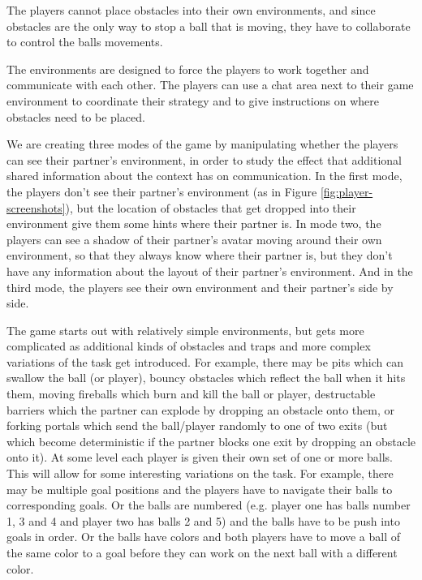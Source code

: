 The players cannot place obstacles into their own environments, and
since obstacles are the only way to stop a ball that is moving, they
have to collaborate to control the balls movements. 



The environments are designed to force the players to work together
and communicate with each other.  The players can use a chat area next
to their game environment to coordinate their strategy and to give
instructions on where obstacles need to be placed.



We are creating three modes of the game by manipulating whether the
players can see their partner's environment, in order to study the
effect that additional shared information about the context has on
communication.  In the first mode, the players don't see their
partner's environment (as in Figure \ref{fig:player-screenshots}), but
the location of obstacles that get dropped into their environment give
them some hints where their partner is. In mode two, the players can
see a shadow of their partner's avatar moving around their own
environment, so that they always know where their partner is, but they
don't have any information about the layout of their partner's
environment. And in the third mode, the players see their
own environment and their partner's side by side.



The game starts out with relatively simple environments, but gets more
complicated as additional kinds of obstacles and traps and more
complex variations of the task get introduced.  For example, there may
be pits which can swallow the ball (or player), bouncy obstacles which
reflect the ball when it hits them, moving fireballs which burn and
kill the ball or player, destructable barriers which the partner can
explode by dropping an obstacle onto them, or forking portals which
send the ball/player randomly to one of two exits (but which become
deterministic if the partner blocks one exit by dropping an obstacle
onto it).   At some level
each player is given their own set of one or more balls. This will
allow for some interesting variations on the task. For example, there
may be multiple goal positions and the players have to navigate their
balls to corresponding goals. Or the balls are numbered (e.g. player
one has balls number 1, 3 and 4 and player two has balls 2 and 5) and
the balls have to be push into goals in order. Or the balls have
colors and both players have to move a ball of the same color to a
goal before they can work on the next ball with a different color.
